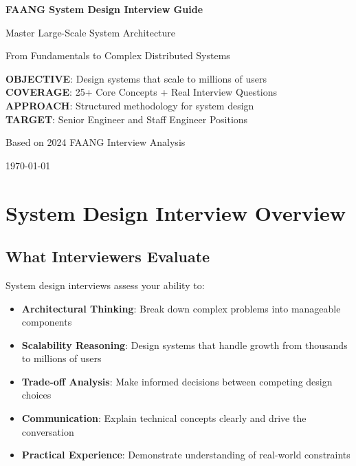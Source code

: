 \documentclass[10pt,a4paper]{article}
\begin{document}
\begin{titlepage}
\centering
{\huge\bfseries FAANG System Design Interview Guide\par}
\vspace{1cm}
{\LARGE Master Large-Scale System Architecture\par}
\vspace{1.5cm}
{\Large From Fundamentals to Complex Distributed Systems\par}
\vspace{2cm}

\begin{tcolorbox}[colback=lightblue,colframe=primaryblue,width=0.8\textwidth]
\centering
\textbf{OBJECTIVE}: Design systems that scale to millions of users\\
\textbf{COVERAGE}: 25+ Core Concepts + Real Interview Questions\\
\textbf{APPROACH}: Structured methodology for system design\\
\textbf{TARGET}: Senior Engineer and Staff Engineer Positions
\end{tcolorbox}

\vspace{2cm}
{\large Based on 2024 FAANG Interview Analysis\par}
\vfill
{\large \today\par}
\end{titlepage}

\tableofcontents
\newpage

\section{System Design Interview Overview}

\subsection{What Interviewers Evaluate}

System design interviews assess your ability to:
\begin{itemize}
\item \textbf{Architectural Thinking}: Break down complex problems into manageable components
\item \textbf{Scalability Reasoning}: Design systems that handle growth from thousands to millions of users
\item \textbf{Trade-off Analysis}: Make informed decisions between competing design choices
\item \textbf{Communication}: Explain technical concepts clearly and drive the conversation
\item \textbf{Practical Experience}: Demonstrate understanding of real-world constraints
\end{itemize}
\end{document}
